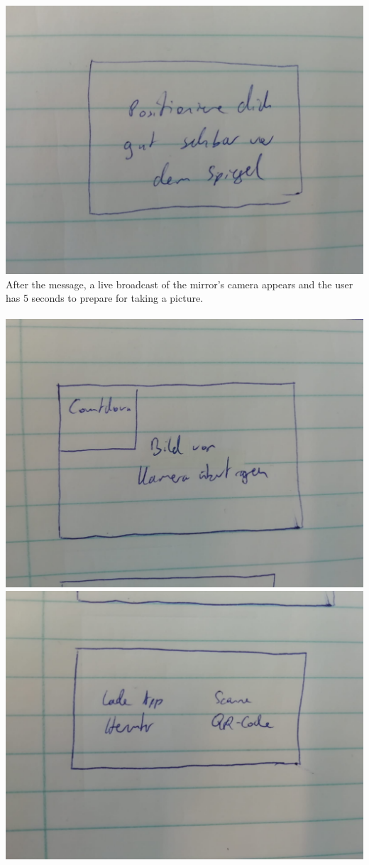 \documentclass[12pt]{article}
\theoremstyle{definition}
\begin{document}
\includegraphics[scale=.1]{UseCase/PositionCorerectlyRegistrationAlert.jpeg}\\
After the message, a live broadcast of the  mirror's camera appears and the user has 5 seconds to prepare for taking a picture. \\
\\
\includegraphics[scale=.1]{UseCase/RegistrationCountdownLiveBild.jpeg}\\
\includegraphics[scale=.1]{UseCase/DownloadDahoamAppAndScanQR-CodeREgistration.jpeg}\\
\end{document}
